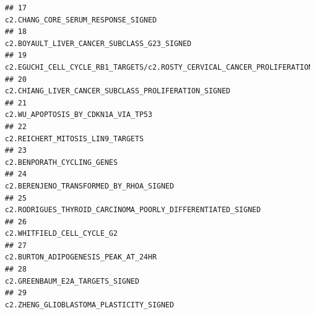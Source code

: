 \documentclass{article}\usepackage[]{graphicx}\usepackage[]{color}
\makeatletter
\newenvironment{kframe}{%
 \def\at@end@of@kframe{}%
 \ifinner\ifhmode%
  \def\at@end@of@kframe{\end{minipage}}%
  \begin{minipage}{\columnwidth}%
 \fi\fi%
 \def\FrameCommand##1{\hskip\@totalleftmargin \hskip-\fboxsep
 \colorbox{shadecolor}{##1}\hskip-\fboxsep
     \hskip-\linewidth \hskip-\@totalleftmargin \hskip\columnwidth}%
 \MakeFramed {\advance\hsize-\width
   \@totalleftmargin\z@ \linewidth\hsize
   \@setminipage}}%
 {\par\unskip\endMakeFramed%
 \at@end@of@kframe}
\newenvironment{knitrout}{}{} %
\makeatother
\begin{document}
\begin{knitrout}
\begin{kframe}
\begin{verbatim}
## 17                                                                                                                                                                               c2.CHANG_CORE_SERUM_RESPONSE_SIGNED
## 18                                                                                                                                                                       c2.BOYAULT_LIVER_CANCER_SUBCLASS_G23_SIGNED
## 19                                                   c2.EGUCHI_CELL_CYCLE_RB1_TARGETS/c2.ROSTY_CERVICAL_CANCER_PROLIFERATION_CLUSTER/c4.GNF2_BUB1/c4.GNF2_ESPL1/c4.GNF2_PCNA/c4.GNF2_RRM2/c4.GNF2_BUB1B/c4.GNF2_MCM4
## 20                                                                                                                                                              c2.CHIANG_LIVER_CANCER_SUBCLASS_PROLIFERATION_SIGNED
## 21                                                                                                                                                                                c2.WU_APOPTOSIS_BY_CDKN1A_VIA_TP53
## 22                                                                                                                                                                                  c2.REICHERT_MITOSIS_LIN9_TARGETS
## 23                                                                                                                                                                                        c2.BENPORATH_CYCLING_GENES
## 24                                                                                                                                                                           c2.BERENJENO_TRANSFORMED_BY_RHOA_SIGNED
## 25                                                                                                                                                       c2.RODRIGUES_THYROID_CARCINOMA_POORLY_DIFFERENTIATED_SIGNED
## 26                                                                                                                                                                                        c2.WHITFIELD_CELL_CYCLE_G2
## 27                                                                                                                                                                               c2.BURTON_ADIPOGENESIS_PEAK_AT_24HR
## 28                                                                                                                                                                                   c2.GREENBAUM_E2A_TARGETS_SIGNED
## 29                                                                                                                                                                           c2.ZHENG_GLIOBLASTOMA_PLASTICITY_SIGNED

\end{verbatim}
\end{kframe}
\end{knitrout}
\end{document}
